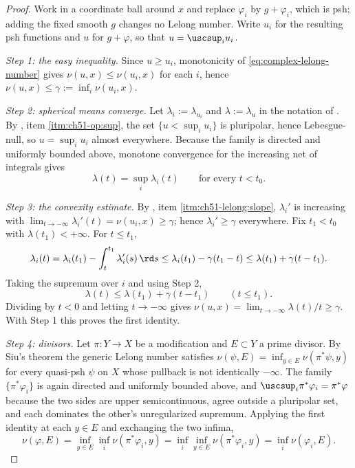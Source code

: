 \begin{proof}
Work in a coordinate ball around \(x\) and replace \(\varphi_i\) by
\(g+\varphi_i\), which is psh; adding the fixed smooth \(g\) changes no
Lelong number.  Write \(u_i\) for the resulting psh functions and
\(u\) for \(g+\varphi\), so that \(u=\uscsup_iu_i\).

\emph{Step 1: the easy inequality.}  Since \(u\geq u_i\), monotonicity of
\eqref{eq:complex-lelong-number} gives
\(\nu(u,x)\leq\nu(u_i,x)\) for each \(i\), hence
\(\nu(u,x)\leq\gamma:=\inf_i\nu(u_i,x)\).

\emph{Step 2: spherical means converge.}  Let \(\lambda_i:=\lambda_{u_i}\)
and \(\lambda:=\lambda_u\) in the notation of
.  By
, item \cref{itm:ch51-op:sup}, the set
\(\{u<\sup_iu_i\}\) is pluripolar, hence Lebesgue-null, so
\(u=\sup_iu_i\) almost everywhere.  Because the family is directed and
uniformly bounded above, monotone convergence for the increasing net of
integrals gives
\[
 \lambda(t)=\sup_i\lambda_i(t)
 \qquad\text{for every }t<t_0 .
\]

\emph{Step 3: the convexity estimate.}  By
, item \cref{itm:ch51-lelong:slope},
\(\lambda_i'\) is increasing with
\(\lim_{t\to-\infty}\lambda_i'(t)=\nu(u_i,x)\geq\gamma\); hence
\(\lambda_i'\geq\gamma\) everywhere.  Fix \(t_1<t_0\) with
\(\lambda(t_1)<+\infty\).  For \(t\leq t_1\),
\[
 \lambda_i(t)
 =\lambda_i(t_1)-\int_t^{t_1}\lambda_i'(s)\,\rd s
 \leq\lambda_i(t_1)-\gamma(t_1-t)
 \leq\lambda(t_1)+\gamma(t-t_1).
\]
Taking the supremum over \(i\) and using Step 2,
\[
 \lambda(t)\leq\lambda(t_1)+\gamma(t-t_1)
 \qquad(t\leq t_1).
\]
Dividing by \(t<0\) and letting \(t\to-\infty\) gives
\(\nu(u,x)=\lim_{t\to-\infty}\lambda(t)/t\geq\gamma\).  With Step 1 this
proves the first identity.

\emph{Step 4: divisors.}  Let \(\pi:Y\to X\) be a modification and
\(E\subset Y\) a prime divisor.  By Siu's theorem the generic Lelong
number satisfies \(\nu(\psi,E)=\inf_{y\in E}\nu(\pi^*\psi,y)\) for every
quasi-psh \(\psi\) on \(X\) whose pullback is not identically \(-\infty\).
The family \(\{\pi^*\varphi_i\}\) is again directed and uniformly bounded
above, and \(\uscsup_i\pi^*\varphi_i=\pi^*\varphi\) because the two sides
are upper semicontinuous, agree outside a pluripolar set, and each
dominates the other's unregularized supremum.  Applying the first identity
at each \(y\in E\) and exchanging the two infima,
\[
 \nu(\varphi,E)
 =\inf_{y\in E}\inf_i\nu(\pi^*\varphi_i,y)
 =\inf_i\inf_{y\in E}\nu(\pi^*\varphi_i,y)
 =\inf_i\nu(\varphi_i,E).
\]
\end{proof}

